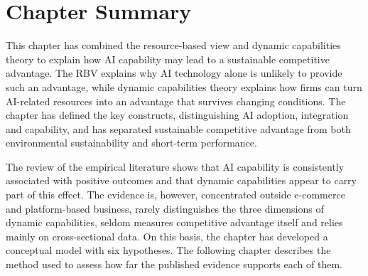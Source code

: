 \section{Chapter Summary}
\label{sec:ch2summary}

This chapter has combined the resource-based view and dynamic capabilities theory to explain how AI capability may lead to a sustainable competitive advantage. The RBV explains why AI technology alone is unlikely to provide such an advantage, while dynamic capabilities theory explains how firms can turn AI-related resources into an advantage that survives changing conditions. The chapter has defined the key constructs, distinguishing AI adoption, integration and capability, and has separated sustainable competitive advantage from both environmental sustainability and short-term performance.

The review of the empirical literature shows that AI capability is consistently associated with positive outcomes and that dynamic capabilities appear to carry part of this effect. The evidence is, however, concentrated outside e-commerce and platform-based business, rarely distinguishes the three dimensions of dynamic capabilities, seldom measures competitive advantage itself and relies mainly on cross-sectional data. On this basis, the chapter has developed a conceptual model with six hypotheses. The following chapter describes the method used to assess how far the published evidence supports each of them.
